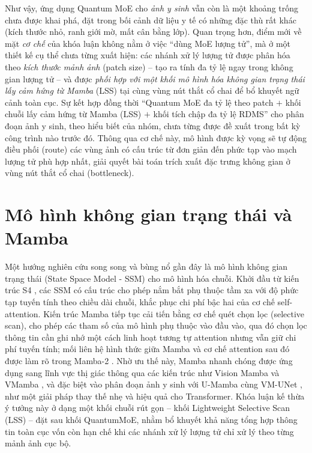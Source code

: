 Như vậy, ứng dụng Quantum MoE cho \emph{ảnh y sinh} vẫn còn là một khoảng trống chưa được khai phá, đặt trong bối cảnh dữ liệu y tế có những đặc thù rất khác (kích thước nhỏ, ranh giới mờ, mất cân bằng lớp). Quan trọng hơn, điểm mới về mặt \emph{cơ chế} của khóa luận không nằm ở việc ``dùng MoE lượng tử'', mà ở một thiết kế cụ thể chưa từng xuất hiện: các nhánh xử lý lượng tử được phân hóa theo \emph{kích thước mảnh ảnh} (patch size) -- tạo ra tính đa tỷ lệ ngay trong không gian lượng tử -- và được \emph{phối hợp với một khối mô hình hóa không gian trạng thái lấy cảm hứng từ Mamba} (LSS) tại cùng vùng nút thắt cổ chai để bổ khuyết ngữ cảnh toàn cục. Sự kết hợp đồng thời ``Quantum MoE đa tỷ lệ theo patch $+$ khối chuỗi lấy cảm hứng từ Mamba (LSS) $+$ khối tích chập đa tỷ lệ RDMS'' cho phân đoạn ảnh y sinh, theo hiểu biết của nhóm, chưa từng được đề xuất trong bất kỳ công trình nào trước đó. Thông qua cơ chế này, mô hình được kỳ vọng sẽ tự động điều phối (route) các vùng ảnh có cấu trúc từ đơn giản đến phức tạp vào mạch lượng tử phù hợp nhất, giải quyết bài toán trích xuất đặc trưng không gian ở vùng nút thắt cổ chai (bottleneck).

\section{Mô hình không gian trạng thái và Mamba}
Một hướng nghiên cứu song song và bùng nổ gần đây là mô hình không gian trạng thái (State Space Model - SSM) cho mô hình hóa chuỗi. Khởi đầu từ kiến trúc S4 \cite{gu2022s4}, các SSM có cấu trúc cho phép nắm bắt phụ thuộc tầm xa với độ phức tạp tuyến tính theo chiều dài chuỗi, khắc phục chi phí bậc hai của cơ chế self-attention. Kiến trúc Mamba \cite{gu2023mamba} tiếp tục cải tiến bằng cơ chế quét chọn lọc (selective scan), cho phép các tham số của mô hình phụ thuộc vào đầu vào, qua đó chọn lọc thông tin cần ghi nhớ một cách linh hoạt tương tự attention nhưng vẫn giữ chi phí tuyến tính; mối liên hệ hình thức giữa Mamba và cơ chế attention sau đó được làm rõ trong Mamba-2 \cite{dao2024mamba2}. Nhờ ưu thế này, Mamba nhanh chóng được ứng dụng sang lĩnh vực thị giác thông qua các kiến trúc như Vision Mamba \cite{zhu2024visionmamba} và VMamba \cite{liu2024vmamba}, và đặc biệt vào phân đoạn ảnh y sinh với U-Mamba \cite{ma2024umamba} cùng VM-UNet \cite{ruan2024vmunet}, như một giải pháp thay thế nhẹ và hiệu quả cho Transformer. Khóa luận kế thừa ý tưởng này ở dạng một khối chuỗi rút gọn -- khối Lightweight Selective Scan (LSS) -- đặt sau khối QuantumMoE, nhằm bổ khuyết khả năng tổng hợp thông tin toàn cục vốn còn hạn chế khi các nhánh xử lý lượng tử chỉ xử lý theo từng mảnh ảnh cục bộ.

